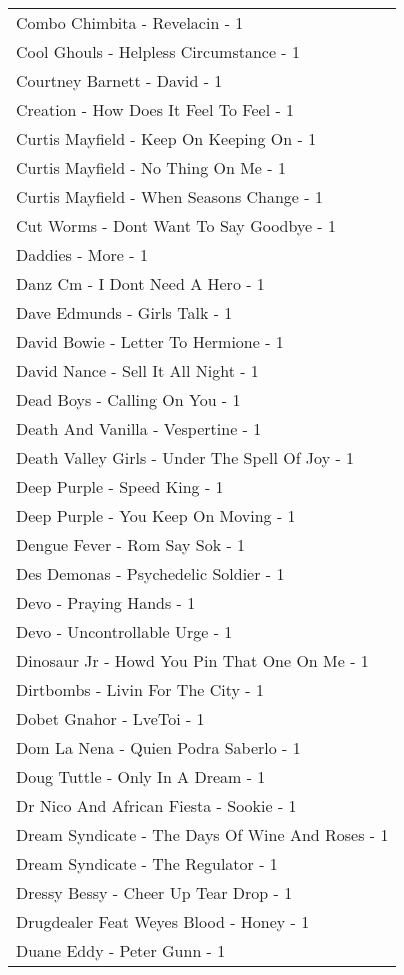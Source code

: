 \documentclass[
]{article}
\begin{document}
\begin{longtable}{l}
Combo Chimbita - Revelacin - 1 \\ 
Cool Ghouls - Helpless Circumstance - 1 \\ 
Courtney Barnett - David - 1 \\ 
Creation - How Does It Feel To Feel - 1 \\ 
Curtis Mayfield - Keep On Keeping On - 1 \\ 
Curtis Mayfield - No Thing On Me - 1 \\ 
Curtis Mayfield - When Seasons Change - 1 \\ 
Cut Worms - Dont Want To Say Goodbye - 1 \\ 
Daddies - More - 1 \\ 
Danz Cm - I Dont Need A Hero - 1 \\ 
Dave Edmunds - Girls Talk - 1 \\ 
David Bowie - Letter To Hermione - 1 \\ 
David Nance - Sell It All Night - 1 \\ 
Dead Boys - Calling On You - 1 \\ 
Death And Vanilla - Vespertine - 1 \\ 
Death Valley Girls - Under The Spell Of Joy - 1 \\ 
Deep Purple - Speed King - 1 \\ 
Deep Purple - You Keep On Moving - 1 \\ 
Dengue Fever - Rom Say Sok - 1 \\ 
Des Demonas - Psychedelic Soldier - 1 \\ 
Devo - Praying Hands - 1 \\ 
Devo - Uncontrollable Urge - 1 \\ 
Dinosaur Jr - Howd You Pin That One On Me - 1 \\ 
Dirtbombs - Livin For The City - 1 \\ 
Dobet Gnahor - LveToi - 1 \\ 
Dom La Nena - Quien Podra Saberlo - 1 \\ 
Doug Tuttle - Only In A Dream - 1 \\ 
Dr Nico And African Fiesta - Sookie - 1 \\ 
Dream Syndicate - The Days Of Wine And Roses - 1 \\ 
Dream Syndicate - The Regulator - 1 \\ 
Dressy Bessy - Cheer Up Tear Drop - 1 \\ 
Drugdealer Feat Weyes Blood - Honey - 1 \\ 
Duane Eddy - Peter Gunn - 1 \\ 

\end{longtable}
\end{document}
